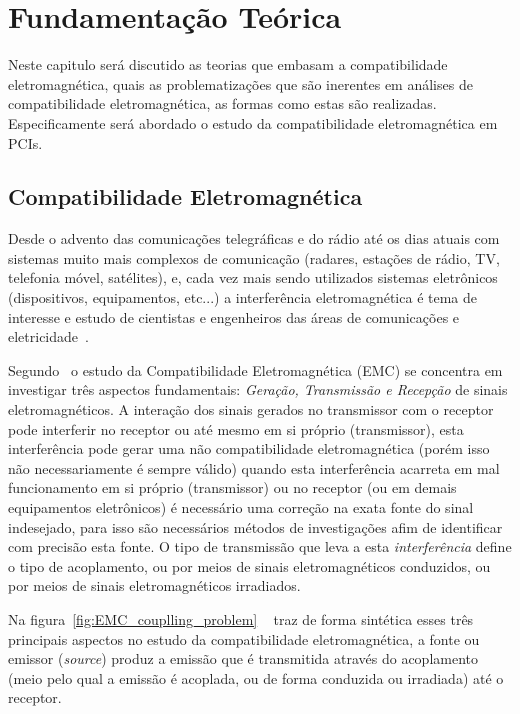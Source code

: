 \chapter{Fundamentação Teórica} \label{fundamentacao}
Neste capitulo será discutido as teorias que embasam a compatibilidade eletromagnética, quais as problematizações que são inerentes em análises de compatibilidade eletromagnética, as formas como estas são realizadas. Especificamente será abordado o estudo da compatibilidade eletromagnética em PCIs. %

\section{Compatibilidade Eletromagnética}
Desde o advento das comunicações telegráficas e do rádio até os dias atuais com sistemas muito mais complexos de comunicação (radares, estações de rádio, TV, telefonia móvel, satélites), e, cada vez mais sendo utilizados sistemas eletrônicos (dispositivos, equipamentos, etc...) a interferência eletromagnética é tema de interesse e estudo de cientistas e engenheiros das áreas de comunicações e eletricidade~\cite[p.~1]{paul2006}.

Segundo~ o estudo da Compatibilidade Eletromagnética (EMC) se concentra em investigar três aspectos fundamentais: \textit{Geração, Transmissão e Recepção} de sinais eletromagnéticos. A interação dos sinais gerados no transmissor com o receptor pode interferir no receptor ou até mesmo em si próprio (transmissor), esta interferência pode gerar uma não compatibilidade eletromagnética (porém isso não necessariamente é sempre válido) quando esta interferência acarreta em mal funcionamento em si próprio (transmissor) ou no receptor (ou em demais equipamentos eletrônicos) é necessário uma correção na exata fonte do sinal indesejado, para isso são necessários métodos de investigações afim de identificar com precisão esta fonte. O tipo de transmissão que leva a esta \textit{interferência} define o tipo de acoplamento, ou por meios de sinais eletromagnéticos conduzidos, ou por meios de sinais eletromagnéticos irradiados.

Na figura~\ref{fig:EMC_couplling_problem} ~ traz de forma sintética esses três principais aspectos no estudo da compatibilidade eletromagnética, a fonte ou emissor (\textit{source}) produz a emissão que é transmitida através do acoplamento (meio pelo qual a emissão é acoplada, ou de forma conduzida ou irradiada) até o receptor.

